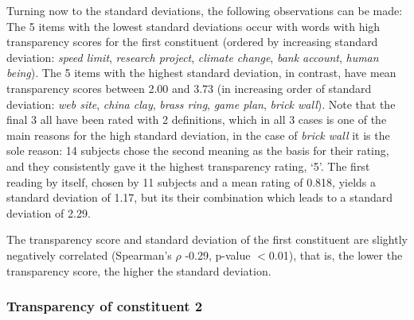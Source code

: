 \begin{table}[!htb]
\end{table}

Turning now to the standard deviations, the following observations can be made: The 5 items with the lowest standard deviations occur with words with high transparency scores for the first constituent
(ordered by increasing standard deviation: \emph{speed limit}, \emph{research
  project}, \emph{climate change}, \emph{bank account}, \emph{human
  being}).
The 5 items with the highest standard deviation, in contrast, have
mean transparency scores between 2.00 and 3.73 (in increasing order of
standard deviation: \emph{web site}, \emph{china clay}, \emph{brass
  ring}, \emph{game plan}, \emph{brick wall}). Note that the final
3 all have been rated with 2 definitions, which in all 3
cases is one of the main reasons for the high standard deviation, in
the case of \emph{brick wall} it is the sole reason: 14 subjects chose
the second meaning as the basis for their rating, and they
consistently gave it the highest transparency rating, `5'. The first reading by itself,
chosen by 11 subjects and a mean rating of 0.818, %
yields a
standard deviation of 1.17, but its their combination which leads to a
standard deviation of 2.29.  

The transparency score and standard deviation of the first constituent are slightly negatively
correlated (Spearman's $\rho$ -0.29, p-value $<$0.01), that is, the
lower the transparency score, the higher the standard deviation.

\subsubsection{Transparency of constituent 2}

